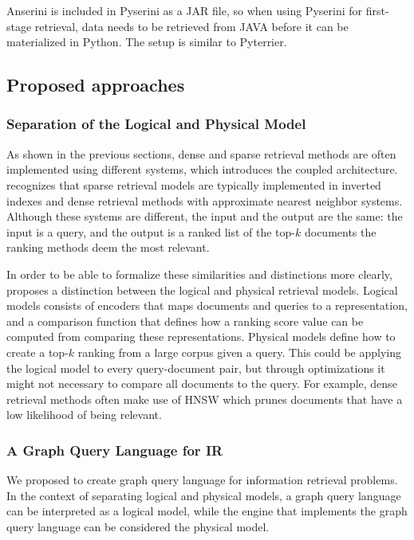 Anserini is included in Pyserini as a JAR file, so when using Pyserini for first-stage retrieval, data needs to be retrieved from JAVA before it can be materialized in Python. The setup is similar to Pyterrier. 

\subsection{Proposed approaches}
\subsubsection{Separation of the Logical and Physical Model}
As shown in the previous sections, dense and sparse retrieval methods are often implemented using different systems, which introduces the coupled architecture. \citet{seperation-logical-physical} recognizes that sparse retrieval models are typically implemented in inverted indexes and dense retrieval methods with approximate nearest neighbor systems. Although these systems are different, the input and the output are the same: the input is a query, and the output is a ranked list of the top-$k$ documents the ranking methods deem the most relevant. 

In order to be able to formalize these similarities and distinctions more clearly, \citeauthor{seperation-logical-physical} proposes a distinction between the logical and physical retrieval models. Logical models consists of encoders that maps documents and queries to a representation, and a comparison function that defines how a ranking score value can be computed from comparing these representations. Physical models define how to create a top-$k$ ranking from a large corpus given a query. This could be applying the logical model to every query-document pair, but through optimizations it might not necessary to compare all documents to the query. For example, dense retrieval methods often make use of HNSW which prunes documents that have a low likelihood of being relevant. 

\subsubsection{A Graph Query Language for IR}
We \citep{need-graph-db} proposed to create graph query language for information retrieval problems. In the context of separating logical and physical models, a graph query language can be interpreted as a logical model, while the engine that implements the graph query language can be considered the physical model.

